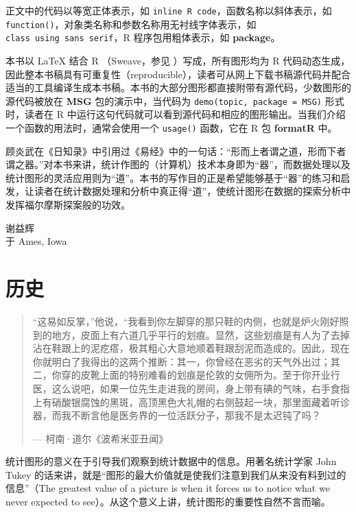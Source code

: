 \documentclass[
  b5paper,
  UTF8,twoside]{book}
\begin{document}
正文中的代码以等宽正体表示，如 \texttt{inline\ R\ code}，函数名称以斜体表示，如 \texttt{function()}，对象类名称和参数名称用无衬线字体表示，如 \texttt{class\ using\ sans\ serif}，R 程序包用粗体表示，如 \textbf{package}。

本书以 LaTeX 结合 R （Sweave，参见 \citet{Leisch02} ）写成，所有图形均为 R 代码动态生成，因此整本书稿具有可重复性（reproducible），读者可从网上下载书稿源代码并配合适当的工具编译生成本书稿。本书的大部分图形都直接附带有源代码，少数图形的源代码被放在 \textbf{MSG} 包的演示中，当代码为 \texttt{demo(\textquotesingle{}topic\textquotesingle{},\ package\ =\ \textquotesingle{}MSG\textquotesingle{})} 形式时，读者在 R 中运行这句代码就可以看到源代码和相应的图形输出。当我们介绍一个函数的用法时，通常会使用一个 \texttt{usage()} 函数，它在 R 包 \textbf{formatR} 中。

顾炎武在《日知录》中引用过《易经》中的一句话：``形而上者谓之道，形而下者谓之器。''对本书来讲，统计作图的（计算机）技术本身即为``器''，而数据处理以及统计图形的灵活应用则为``道''。本书的写作目的正是希望能够基于``器''的练习和启发，让读者在统计数据处理和分析中真正得``道''，使统计图形在数据的探索分析中发挥福尔摩斯探案般的功效。

\begin{flushright}
谢益辉\\
于 Ames, Iowa
\end{flushright}

\hypertarget{cha:history}{%
\chapter{历史}\label{cha:history}}

\begin{quote}
``这易如反掌，''他说，``我看到你左脚穿的那只鞋的内侧，也就是炉火刚好照到的地方，皮面上有六道几乎平行的划痕。显然，这些划痕是有人为了去掉沾在鞋跟上的泥疙瘩，极其粗心大意地顺着鞋跟刮泥而造成的。因此，现在你就明白了我得出的这两个推断：其一，你曾经在恶劣的天气外出过；其二，你穿的皮靴上面的特别难看的划痕是伦敦的女佣所为。至于你开业行医，这么说吧，如果一位先生走进我的房间，身上带有碘的气味，右手食指上有硝酸银腐蚀的黑斑，高顶黑色大礼帽的右侧鼓起一块，那里面藏着听诊器，而我不断言他是医务界的一位活跃分子，那我不是太迟钝了吗？

\hspace*{\fill} --- 柯南·道尔《波希米亚丑闻》
\end{quote}

统计图形的意义在于引导我们观察到统计数据中的信息。用著名统计学家 John Tukey 的话来讲，就是``图形的最大价值就是使我们注意到我们从来没有料到过的信息''（The greatest value of a picture is when it forces us to notice what we never expected to see）。从这个意义上讲，统计图形的重要性自然不言而喻。
\end{document}
